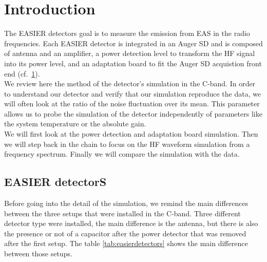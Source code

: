 \section*{Introduction}
The EASIER detectors  goal is to measure the emission  from EAS in the
radio frequencies.  Each EASIER detector  is integrated in an Auger SD
and is composed  of antenna and an amplifier,  a power detection level
to transform  the HF  signal into its  power level, and  an adaptation
board    to    fit    the    Auger    SD    acquistion    front    end
(cf.~\ref{fig:detscheme}).\\  We   review  here  the   method  of  the
detector's  simulation in  the  C-band.  In  order  to understand  our
detector and  verify that our  simulation reproduce the data,  we will
often look at  the ratio of the noise fluctuation  over its mean. This
parameter  allows   us  to  probe  the  simulation   of  the  detector
independently  of  parameters  like  the  system  temperature  or  the
absolute  gain.  \\We will  first  look  at  the power  detection  and
adaptation board simulation.   Then we will step back  in the chain to
focus  on  the  HF  waveform  simulation from  a  frequency  spectrum.
Finally we will compare the simulation with the data.
\begin{figure}[!ht]
  \centering
  \hspace*{-3ex}
  \caption{}
  \label{fig:detscheme}
\end{figure}
\subsection*{EASIER detectorS}
Before going  into the  detail of the  simulation, we remind  the main
differences  between  the three  setups  that  were  installed in  the
C-band.   Three  different  detector  type were  installed,  the  main
difference is the antenna, but there  is also the presence or not of a
capacitor after  the power detector  that was removed after  the first
setup. The  table \ref{tab:easierdetectors} shows  the main difference
between those setups.

